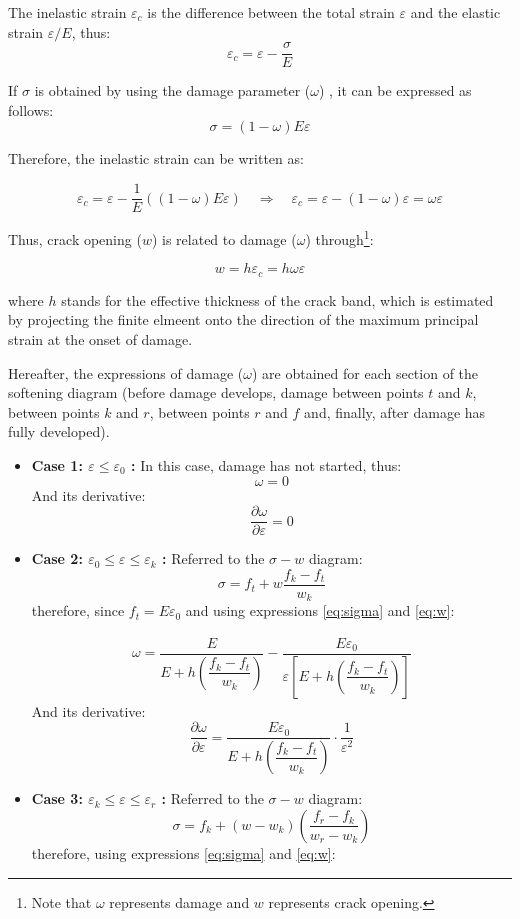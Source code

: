 \documentclass[a4paper]{article}
\begin{document}
\begin{itemize}
The inelastic strain $\varepsilon_c$ is the difference between the total strain $\varepsilon$ and the elastic strain $\varepsilon/E$, thus:
\[
\varepsilon_c = \varepsilon - \dfrac{\sigma}{E}
\]

If $\sigma$ is obtained by using the damage parameter ($\omega$) , it can be expressed as follows: 
\begin{equation}
\sigma = (1-\omega) E \varepsilon
\label{eq:sigma}
\end{equation}


Therefore, the inelastic strain can be written as: 

\[
\varepsilon_c =  \varepsilon - \dfrac{1}{E}\left( (1-\omega) E \varepsilon\right) \quad \Rightarrow \quad \varepsilon_c = \varepsilon - (1- \omega) \varepsilon = \omega \varepsilon
\]

Thus, crack opening ($w$) is related to damage ($\omega$) through\footnote{Note that $\omega$ represents damage and $w$ represents crack opening. }:

\begin{equation}
w = h \varepsilon_c = h \omega \varepsilon
\label{eq:w}
\end{equation}



\noindent where $h$ stands for the effective thickness of the crack band, which is estimated by projecting the finite elmeent onto the direction of the maximum principal strain at the onset of damage.

Hereafter, the expressions of damage ($\omega$)  are obtained for each section of the softening diagram (before damage develops, damage between points $t$ and $k$, between points $k$ and $r$, between points $r$ and $f$ and, finally, after damage has fully developed).
\begin{itemize}
	\item {\bf Case 1: $\varepsilon \leq \varepsilon_0$ :}
	In this case, damage has not started, thus: 
	\[
	\omega=0
	\]
	And its derivative:
	\[
	\dfrac{\partial \omega}{\partial \varepsilon}=0
	\]
	\item {\bf Case 2: $\varepsilon_0 \le \varepsilon \leq \varepsilon_k$ :}
	Referred to the $\sigma-w$ diagram:	
	\[
	\sigma = f_t + w \dfrac{f_k -f_t}{w_k} 
	\]
	therefore, since $f_t = E \varepsilon_0$ and using expressions \eqref{eq:sigma} and \eqref{eq:w}:
	
	\begin{align*}	
	\omega = \dfrac{E}{E + h \left(\dfrac{f_k-f_t}{w_k}\right) } - \dfrac{E \varepsilon_0}{\varepsilon\left[E + h\left(\dfrac{f_k-f_t}{w_k}\right) \right]}
	\end{align*}
	And its derivative:
	\[
	\dfrac{\partial \omega}{\partial \varepsilon}=\dfrac{E \varepsilon_0}{E + h \left(\dfrac{f_k-f_t}{w_k}\right) } \cdot \dfrac{1}{\varepsilon^2}
	\] 
	\item {\bf Case 3: $\varepsilon_k \le \varepsilon \leq \varepsilon_r$ :}
	Referred to the $\sigma-w$ diagram:	
	\[
	\sigma = f_k + (w-w_k) \left(\dfrac{f_r -f_k}{w_r - w_k} \right)
	\]
	therefore, using expressions \eqref{eq:sigma} and \eqref{eq:w}:
	

\end{itemize}
\end{itemize}
\end{document}
